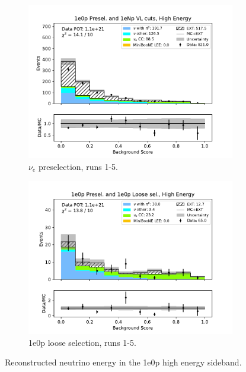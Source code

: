 \begin{figure}[H]
\begin{subfigure}{0.5\linewidth}
    \includegraphics[width=\linewidth]{technote/Sidebands/Figures/FarSideband/far_sideband_bkg_score_run1234b4c4d5_ZP_ZP_HIGH_ENERGY.pdf}
    \caption{$\nu_e$ preselection, runs 1-5.}
    \end{subfigure}%
    \begin{subfigure}{0.5\linewidth}
    \includegraphics[width=\linewidth]{technote/Sidebands/Figures/FarSideband/far_sideband_bkg_score_run1234b4c4d5_ZP_ZPLOOSESEL_HIGH_ENERGY.pdf}
    \caption{1e0p loose selection, runs 1-5.}
    \end{subfigure}
    \caption{Reconstructed neutrino energy in the 1e0p high energy sideband.}
    \label{fig:HighEnergy1eNp_nonpi0_score}
\end{figure}

